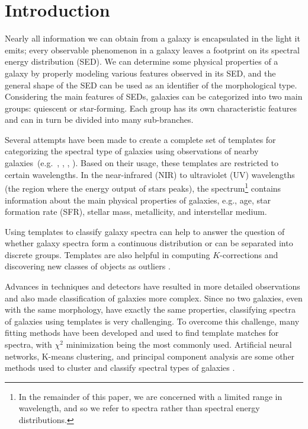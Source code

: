 \section{Introduction}
\label{sec: intro_somz}

Nearly all information we can obtain from a galaxy is encapsulated in the light it emits; every observable phenomenon in a galaxy leaves a footprint on its spectral energy distribution (SED).
We can determine some physical properties of a galaxy by properly modeling various features observed in its SED, and the general shape of the SED can be used as an identifier of the morphological type.
Considering the main features of SEDs, galaxies can be categorized into two main groups: quiescent or star-forming.
Each group has its own characteristic features and can in turn be divided into many sub-branches.


Several attempts have been made to create a complete set of templates for categorizing the spectral type of galaxies using observations of nearby galaxies~(e.g.~\citealt{Kinney93}, \citealt[][hereafter ]{Kinney96}, \citealt{Bershady00}, \citealt{Mannucci01}). 
Based on their usage, these templates are restricted to certain wavelengths.
In the near-infrared (NIR) to ultraviolet (UV) wavelengths (the region where the energy output of stars peaks), the spectrum\footnote{In the remainder of this paper, we are concerned with a limited range in wavelength, and so we refer to spectra rather than spectral energy distributions.} contains information about the main physical properties of galaxies, e.g., age, star formation rate (SFR), stellar mass, metallicity, and interstellar medium. 

Using templates to classify galaxy spectra can help to answer the question of whether galaxy spectra form a continuous distribution or can  be separated into discrete groups.
Templates are also helpful in computing $K$-corrections and discovering new classes of objects as outliers \citep{Folkes96}.




Advances in techniques and detectors have resulted in more detailed observations and also made classification of galaxies more complex.
Since no two galaxies, even with the same morphology, have exactly the same properties, classifying spectra of galaxies using templates is very challenging.
To overcome this challenge, many fitting methods have been developed and used to find template matches for spectra, with $\chi^2$ minimization being the most commonly used. 
Artificial neural networks, K-means clustering, and principal component analysis are some other methods used to cluster and classify spectral types of galaxies \citep[e.g.][]{Allen13,Ordov14,Shi15}.


